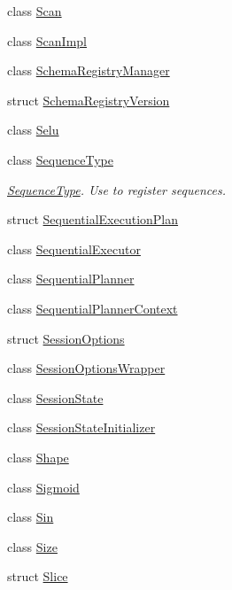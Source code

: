 \begin{DoxyCompactItemize}
\item 
class \mbox{\hyperlink{classonnxruntime_1_1Scan}{Scan}}
\item 
class \mbox{\hyperlink{classonnxruntime_1_1ScanImpl}{Scan\+Impl}}
\item 
class \mbox{\hyperlink{classonnxruntime_1_1SchemaRegistryManager}{Schema\+Registry\+Manager}}
\item 
struct \mbox{\hyperlink{structonnxruntime_1_1SchemaRegistryVersion}{Schema\+Registry\+Version}}
\item 
class \mbox{\hyperlink{classonnxruntime_1_1Selu}{Selu}}
\item 
class \mbox{\hyperlink{classonnxruntime_1_1SequenceType}{Sequence\+Type}}
\begin{DoxyCompactList}\small\item\em \mbox{\hyperlink{classonnxruntime_1_1SequenceType}{Sequence\+Type}}. Use to register sequences. \end{DoxyCompactList}\item 
struct \mbox{\hyperlink{structonnxruntime_1_1SequentialExecutionPlan}{Sequential\+Execution\+Plan}}
\item 
class \mbox{\hyperlink{classonnxruntime_1_1SequentialExecutor}{Sequential\+Executor}}
\item 
class \mbox{\hyperlink{classonnxruntime_1_1SequentialPlanner}{Sequential\+Planner}}
\item 
class \mbox{\hyperlink{classonnxruntime_1_1SequentialPlannerContext}{Sequential\+Planner\+Context}}
\item 
struct \mbox{\hyperlink{structonnxruntime_1_1SessionOptions}{Session\+Options}}
\item 
class \mbox{\hyperlink{classonnxruntime_1_1SessionOptionsWrapper}{Session\+Options\+Wrapper}}
\item 
class \mbox{\hyperlink{classonnxruntime_1_1SessionState}{Session\+State}}
\item 
class \mbox{\hyperlink{classonnxruntime_1_1SessionStateInitializer}{Session\+State\+Initializer}}
\item 
class \mbox{\hyperlink{classonnxruntime_1_1Shape}{Shape}}
\item 
class \mbox{\hyperlink{classonnxruntime_1_1Sigmoid}{Sigmoid}}
\item 
class \mbox{\hyperlink{classonnxruntime_1_1Sin}{Sin}}
\item 
class \mbox{\hyperlink{classonnxruntime_1_1Size}{Size}}
\item 
struct \mbox{\hyperlink{structonnxruntime_1_1Slice}{Slice}}

\end{DoxyCompactItemize}
